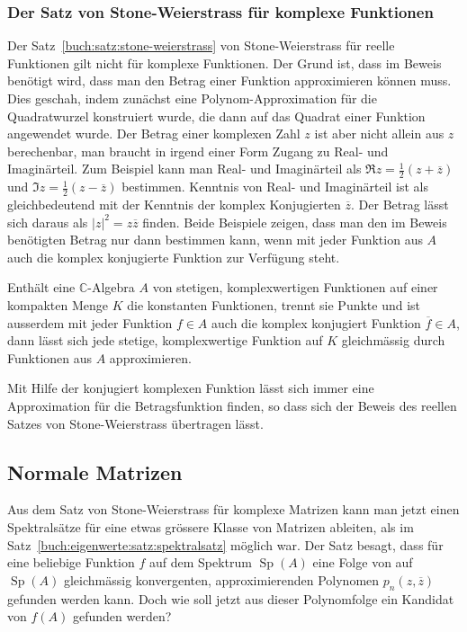 \subsubsection{Der Satz von Stone-Weierstrass für komplexe Funktionen}
Der Satz~\ref{buch:satz:stone-weierstrass} von Stone-Weierstrass für
reelle Funktionen gilt nicht für komplexe Funktionen.
Der Grund ist, dass im Beweis benötigt wird, dass man den Betrag
einer Funktion approximieren können muss.
Dies geschah, indem zunächst eine Polynom-Approximation für die 
Quadratwurzel konstruiert wurde, die dann auf das Quadrat einer
Funktion angewendet wurde.
Der Betrag einer komplexen Zahl $z$ ist aber nicht allein aus $z$
berechenbar, man braucht in irgend einer Form Zugang zu Real-
und Imaginärteil.
Zum Beispiel kann man Real- und Imaginärteil als
$\Re z= \frac12(z+\overline{z})$ und $\Im z = \frac12(z-\overline{z})$
bestimmen.
Kenntnis von Real- und Imaginärteil ist als gleichbedeutend mit
der Kenntnis der komplex Konjugierten $\overline{z}$.
Der Betrag lässt sich daraus als $|z|^2 = z\overline{z}$ finden.
Beide Beispiele zeigen, dass man den im Beweis benötigten Betrag
nur dann bestimmen kann, wenn mit jeder Funktion aus $A$ auch die
komplex konjugierte Funktion zur Verfügung steht.

\begin{satz}
Enthält eine $\mathbb{C}$-Algebra $A$ von stetigen, komplexwertigen
Funktionen auf einer kompakten Menge $K$ die konstanten Funktionen,
trennt sie Punkte und ist ausserdem mit jeder Funktion $f\in A$ auch
die komplex konjugiert Funktion $\overline{f}\in A$,
dann lässt sich jede stetige, komplexwertige Funktion 
auf $K$ gleichmässig durch Funktionen aus $A$ approximieren.
\end{satz}

Mit Hilfe der konjugiert komplexen Funktion lässt sich immer eine
Approximation für die Betragsfunktion finden, so dass sich der
Beweis des reellen Satzes von Stone-Weierstrass übertragen lässt.

%
%
\subsection{Normale Matrizen
\label{buch:subsection:normale-matrizen}}
Aus dem Satz von Stone-Weierstrass für komplexe Matrizen kann man
jetzt einen Spektralsätze für eine etwas grössere Klasse von Matrizen
ableiten, als im Satz~\ref{buch:eigenwerte:satz:spektralsatz}
möglich war.
Der Satz besagt, dass für eine beliebige Funktion $f$ auf dem Spektrum
$\operatorname{Sp}(A)$ eine Folge von auf $\operatorname{Sp}(A)$
gleichmässig konvergenten, approximierenden Polynomen
$p_n(z,\overline{z})$ gefunden werden kann.
Doch wie soll jetzt aus dieser Polynomfolge ein Kandidat von $f(A)$
gefunden werden?

